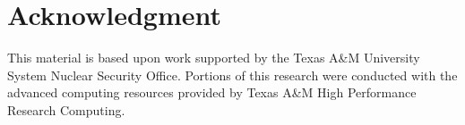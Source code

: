 \documentclass[lettersize,journal]{IEEEtran}
\begin{document}




\section*{Acknowledgment}
This material is based upon work supported by the Texas A\&M University System Nuclear Security Office. Portions of this research were conducted with the advanced computing resources provided by Texas A\&M High Performance Research Computing.

\balance







\vfill
\end{document}
